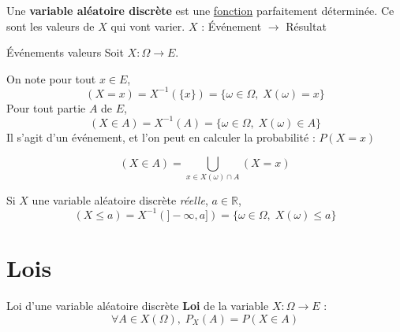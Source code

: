 \begin{note}{}{}
Une \textbf{variable aléatoire discrète} est une \underline{fonction} parfaitement déterminée. Ce sont les valeurs de $X$ qui vont varier.
\center 
$X$ : {Événement} $\to$ {Résultat}
\end{note}

\begin{Definition}[colbacktitle=red!75!black]{Événements valeurs}{}
Soit $X : \Omega \to E$. 

On note pour tout $x \in E$,
\begin{equation}
(X =x) = X ^{-1}(\{x\}) = \{ \omega \in \Omega, \; X(\omega) = x \}
\end{equation}
Pour tout partie $A$ de $E$,
\begin{equation}
  (X \in A) = X ^{-1}(A) = \{ \omega \in \Omega, \; X(\omega)\in A\}
\end{equation}
Il s'agit d'un événement, et l'on peut en calculer la probabilité : $P(X=x)$

\end{Definition}


\begin{Prop}{}{}
\begin{equation}
  (X \in A) = \bigcup _{x \in X(\omega) \cap A} (X=x)
\end{equation}
\end{Prop}


\begin{Definition}[colbacktitle=red!75!black]{}{}
Si $X$ une variable aléatoire discrète \textit{réelle}, $a \in \mathbb{R}$, 
\begin{equation}
  (X \le a) = X ^{-1}(]- \infty
  , a]) = \{ \omega \in \Omega, \; X(\omega) \le a\}
\end{equation}
\end{Definition}







\section{Lois} %

\begin{Definition}[colbacktitle=red!75!black]{Loi d'une variable aléatoire discrète}{}
\textbf{Loi} de la variable $X : \Omega \to E$ :
\begin{equation}
  \forall A \in X(\Omega), \; P_X(A) = P(X \in A)
\end{equation}

\end{Definition}

